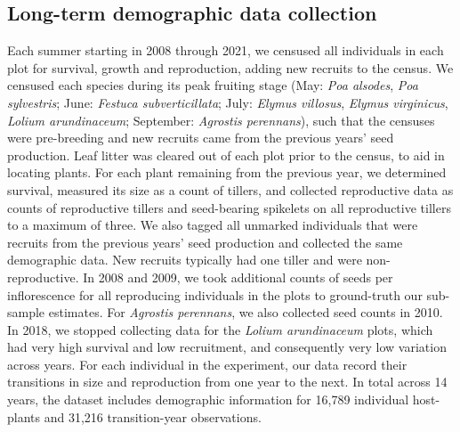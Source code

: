 \documentclass[9pt,twocolumn,twoside]{pnas-new}
\begin{document}
{\subsection*{Long-term demographic data collection}
Each summer starting in 2008 through 2021, we censused all individuals in each plot for survival, growth and reproduction, adding new recruits to the census.
We censused each species during its peak fruiting stage (May: \emph{Poa alsodes}, \emph{Poa sylvestris}; June: \emph{Festuca subverticillata}; July: \emph{Elymus villosus}, \emph{Elymus virginicus}, \emph{Lolium arundinaceum}; September: \emph{Agrostis perennans}), such that the censuses were pre-breeding and new recruits came from the previous years' seed production.
Leaf litter was cleared out of each plot prior to the census, to aid in locating plants.
For each plant remaining from the previous year, we determined survival, measured its size as a count of tillers, and collected reproductive data as counts of reproductive tillers and seed-bearing spikelets on all reproductive tillers to a maximum of three. 
We also tagged all unmarked individuals that were recruits from the previous years' seed production and collected the same demographic data.
New recruits typically had one tiller and were non-reproductive. 
In 2008 and 2009, we took additional counts of seeds per inflorescence for all reproducing individuals in the plots to ground-truth our sub-sample estimates. 
For \emph{Agrostis perennans}, we also collected seed counts in 2010.
In 2018, we stopped collecting data for the \emph{Lolium arundinaceum} plots, which had very high survival and low recruitment, and consequently very low variation across years.
For each individual in the experiment, our data record their transitions in size and reproduction from one year to the next. 
In total across 14 years, the dataset includes demographic information for 16,789 individual host-plants and 31,216 transition-year observations.

}
\end{document}
